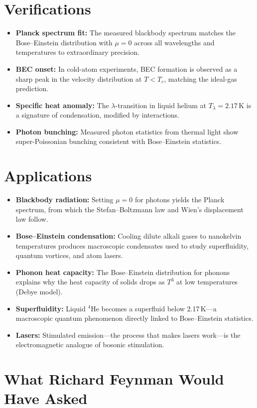 \section*{Verifications}

\begin{itemize}
\item \textbf{Planck spectrum fit:} The measured blackbody spectrum matches the Bose--Einstein distribution with $\mu = 0$ across all wavelengths and temperatures to extraordinary precision.
\item \textbf{BEC onset:} In cold-atom experiments, BEC formation is observed as a sharp peak in the velocity distribution at $T < T_c$, matching the ideal-gas prediction.
\item \textbf{Specific heat anomaly:} The $\lambda$-transition in liquid helium at $T_\lambda = 2.17$\,K is a signature of condensation, modified by interactions.
\item \textbf{Photon bunching:} Measured photon statistics from thermal light show super-Poissonian bunching consistent with Bose--Einstein statistics.
\end{itemize}
\section*{Applications}

\begin{itemize}
\item \textbf{Blackbody radiation:} Setting $\mu = 0$ for photons yields the Planck spectrum, from which the Stefan--Boltzmann law and Wien's displacement law follow.
\item \textbf{Bose--Einstein condensation:} Cooling dilute alkali gases to nanokelvin temperatures produces macroscopic condensates used to study superfluidity, quantum vortices, and atom lasers.
\item \textbf{Phonon heat capacity:} The Bose--Einstein distribution for phonons explains why the heat capacity of solids drops as $T^3$ at low temperatures (Debye model).
\item \textbf{Superfluidity:} Liquid $^4$He becomes a superfluid below 2.17\,K---a macroscopic quantum phenomenon directly linked to Bose--Einstein statistics.
\item \textbf{Lasers:} Stimulated emission---the process that makes lasers work---is the electromagnetic analogue of bosonic stimulation.
\end{itemize}
\section*{What Richard Feynman Would Have Asked}

